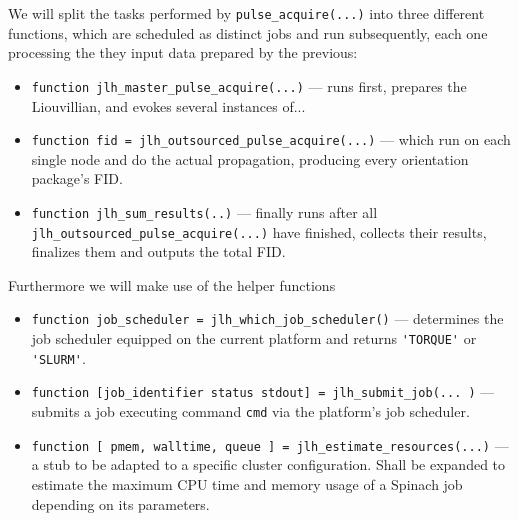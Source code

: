 \documentclass[11.5pt,a4paper]{article}
\begin{document}
We will split the tasks performed by \verb$pulse_acquire(...)$ into three different functions, which are scheduled as distinct jobs and run subsequently, each one processing the they input data prepared by the previous:
\begin{itemize}
 \item \verb$function jlh_master_pulse_acquire(...)$ --- runs first, prepares the Liouvillian, and evokes several instances of... 
  \item \verb$function fid = jlh_outsourced_pulse_acquire(...)$ --- which run on each single node and do the actual propagation, producing every orientation package's FID.
  \item \verb$function jlh_sum_results(..)$ --- finally runs after all \verb$jlh_outsourced_pulse_acquire(...)$ have finished, collects their results, finalizes them and outputs the total FID.          
\end{itemize}
Furthermore we will make use of the helper functions
\begin{itemize}
 \item \verb$function job_scheduler = jlh_which_job_scheduler()$ --- determines the job scheduler equipped on the current platform and returns \verb$'TORQUE'$ or \verb$'SLURM'$. 
  \item \verb$function [job_identifier status stdout] = jlh_submit_job(... )$ --- submits a job executing command \verb$cmd$ via the platform's job scheduler.
  \item \verb$function [ pmem, walltime, queue ] = jlh_estimate_resources(...)$ --- a stub to be adapted to a specific cluster configuration. Shall be expanded to estimate the maximum CPU time and memory usage of a Spinach job depending on its parameters.
\end{itemize}
\end{document}
